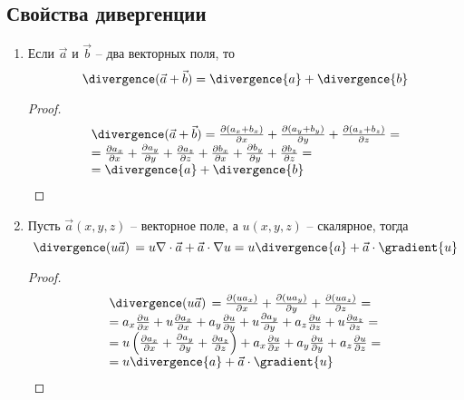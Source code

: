 \subsection{Свойства дивергенции}

	\begin{enumerate}
	\item Если \( \vec{a} \) и \( \vec{b} \) -- два векторных поля, то
	\[ \divergence(\vec{a} + \vec{b}) = \divergence{a} + \divergence{b} \]
	\begin{proof}

	\[ \begin{array}{l}
	\divergence(\vec{a} + \vec{b}) = \frac{\partial (a_x + b_x)}{\partial x} + \frac{\partial (a_y + b_y)}{\partial y} + \frac{\partial (a_z + b_z)}{\partial z} = \\
	= \frac{\partial a_x}{\partial x} + \frac{\partial a_y}{\partial y} + \frac{\partial a_z}{\partial z} + \frac{\partial b_x}{\partial x} + \frac{\partial b_y}{\partial y} + \frac{\partial b_z}{\partial z} = \\
	= \divergence{a} + \divergence{b}
	\end{array} \]
	\end{proof}
	
	\item Пусть \( \vec{a}(x, y, z) \) -- векторное поле, а \( u(x, y, z) \) -- скалярное, тогда
	\begin{equation}
	\divergence(u\vec{a})\, = u\nabla\cdot\vec{a} + \vec{a}\cdot\nabla u = u\divergence{a} + \vec{a}\cdot\gradient{u} \label{eq4:n5}
	\end{equation}
	\begin{proof}
	\[ \begin{array}{l}
	\divergence(u\vec{a})\, = \frac{\partial (ua_x)}{\partial x} + \frac{\partial (ua_y)}{\partial y} + \frac{\partial (ua_z)}{\partial z} = \\
	= a_x\frac{\partial u}{\partial x} + u\frac{\partial a_x}{\partial x} + a_y\frac{\partial u}{\partial y} + u\frac{\partial a_y}{\partial y} + a_z\frac{\partial u}{\partial z} + u\frac{\partial a_z}{\partial z} = \\
	= u\left(\frac{\partial a_x}{\partial x} + \frac{\partial a_y}{\partial y} + \frac{\partial a_z}{\partial z}\right) + a_x\frac{\partial u}{\partial x} + a_y\frac{\partial u}{\partial y} + a_z\frac{\partial u}{\partial z} = \\
	= u\divergence{a} + \vec{a}\cdot\gradient{u}
	\end{array} \]
	\end{proof}
	\end{enumerate}
	
